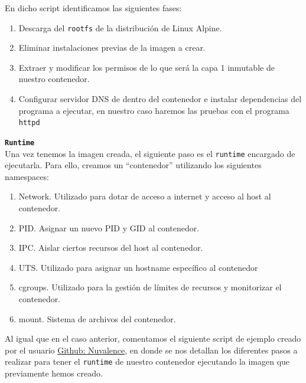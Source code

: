 \documentclass[a4paper, oneside, 12pt]{book}
\begin{document}
	\pagebreak
	
	\noindent En dicho script identificamos las siguientes fases:
	\begin{enumerate}
		\item Descarga del \texttt{rootfs} de la distribución de Linux Alpine.
		\item Eliminar instalaciones previas de la imagen a crear.
		\item Extraer y modificar los permisos de lo que será la capa 1 inmutable de nuestro contenedor.
		\item Configurar servidor DNS de dentro del contenedor e instalar dependencias del programa a ejecutar, en nuestro caso haremos las pruebas con el programa \texttt{httpd}
	\end{enumerate}

	\vspace{10px}

	\noindent \textbf{\large \texttt{Runtime}}\\
	
	\noindent Una vez tenemos la imagen creada, el siguiente paso es el \texttt{runtime} encargado de ejecutarla. Para ello, creamos un ``contenedor'' utilizando los siguientes namespaces: 
	\begin{enumerate}
		\item Network. Utilizado para dotar de acceso a internet y acceso al host al contenedor. 
		\item PID. Asignar un nuevo PID y GID al contenedor.
		\item IPC. Aislar ciertos recursos del host al contenedor.
		\item UTS. Utilizado para asignar un hostname específico al contenedor
		\item cgroups. Utilizado para la gestión de límites de recursos y monitorizar el contenedor.
		\item mount. Sistema de archivos del contenedor.
	\end{enumerate}

	\noindent Al igual que en el caso anterior, comentamos el siguiente script de ejemplo creado por el usuario \href{https://github.com/Nuvalence/diy-container}{Github: Nuvalence}, en donde se nos detallan los diferentes pasos a realizar para tener el \texttt{runtime} de nuestro contenedor ejecutando la imagen que previamente hemos creado.
	
\end{document}
